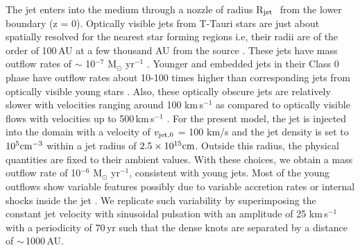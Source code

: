 \documentclass[useAMS,usenatbib]{mn2e}
\newcommand{\rj}{R$_{\rm jet}$}
\begin{document}
The jet enters into the medium through a nozzle of radius \rj\,\,
from the lower boundary (z = 0). Optically visible jets from T-Tauri
stars are just about spatially resolved for the nearest
star forming regions i.e, their radii are of the order of
100\,AU at a few thousand AU from the source \citep{Ray:2012p15733}.
These jets have mass outflow rates of $\sim$ 10$^{-7}$ M$_{\odot}$
yr$^{-1}$ \citep{Dougados:2010p15774}. Younger and 
embedded jets in their Class 0 phase have
outflow rates about 10-100 times higher than 
corresponding jets from optically visible young stars
\citep{Bally:2007p2340, Dionatos:2009p15670, Ray:2012p15733}. Also,
these optically obscure jets are relatively slower with velocities
ranging around 100 km\,s$^{-1}$ \citep{Bally:2007p2340} as compared to
optically visible flows with velocities up to 500\,km\,s$^{-1}$
\citep[e.g,][]{Mundt:1987p15799}.
For the present model, the jet is injected into the domain with a 
velocity of $v_{\rm jet,0}$ = 100 km/s and the jet density is set to
$10^{5} \rm cm^{-3}$ within a jet radius of $2.5\times10^{15} \rm
cm$. Outside this radius, the physical quantities are fixed to their ambient values.
With these choices, we obtain a mass outflow rate of 10$^{-6}$
M$_{\odot}$ yr$^{-1}$, consistent with young jets. Most of the young outflows 
show variable features possibly due to variable accretion rates
or internal shocks inside the jet \citep[e.g.][]{Bachiller:1996p4692}.
We replicate such variability by superimposing the constant jet
velocity with sinusoidal pulsation with an amplitude of 25
km\,s$^{-1}$ with a periodicity of 70\,yr such that the dense knots
are separated by a distance of $\sim$\,1000\,AU.
\end{document}
